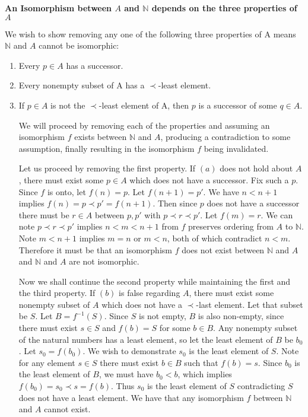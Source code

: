 \documentclass{article}
\begin{document}
\begin{enumerate}
	\medskip
	\textbf{An Isomorphism between $A$ and $\mathbb{N}$ depends on the three properties of $A$}
	\medskip
	
	We wish to show removing any one of the following three properties of A means $\mathbb{N}$ and $A$ cannot be isomorphic:
		\begin{enumerate}
		\item Every $p \in A$ has a successor.
		\item Every nonempty subset of A has a $\prec$-least element.
		\item If $p \in A$ is not the $\prec$-least element of A, then $p$ is a successor of some $q \in A$.
		
		\medskip
		
		We will proceed by removing each of the properties and assuming an isomorphism $f$ exists between $\mathbb{N}$ and $A$, producing a contradiction to some assumption, finally resulting in the isomorphism $f$ being invalidated.
		
		\medskip
		Let us proceed by removing the first property. If $(a)$ does not hold about $A$, there must exist some $p \in A$ which does not have a successor. Fix such a $p$. Since $f$ is onto, let $f(n) = p$. Let $f(n + 1) = p'$. We have $n < n + 1$ implies $f(n) = p \prec p' = f(n + 1)$. Then since $p$ does not have a successor there must be $r \in A$ between $p,p'$ with $p \prec r \prec p'$. Let $f(m) = r$. We can note $p \prec r \prec p'$ implies $n < m < n + 1$ from $f$ preserves ordering from $A$ to $\mathbb{N}$. Note $m < n + 1$ implies $m = n$ or $m < n$, both of which contradict $n < m$. Therefore it must be that an isomorphism $f$ does not exist between $\mathbb{N}$ and $A$ and $\mathbb{N}$ and $A$ are not isomorphic.
		
		\medskip
		Now we shall continue the second property while maintaining the first and the third property. If $(b)$ is false regarding $A$, there must exist some nonempty subset of $A$ which does not have a $\prec$-last element. Let that subset be $S$. Let $B = f^{-1}(S)$. Since $S$ is not empty, $B$ is also non-empty, since there must exist $s \in S$ and $f(b) = S$ for some $b \in B$.	 Any nonempty subset of the natural numbers has a least element, so let the least element of $B$ be $b_0$. Let $s_0 = f(b_0)$. We wish to demonstrate $s_0$ is the least element of $S$. Note for any element $s \in S$ there must exist $b \in B$ such that $f(b) = s$. Since $b_0$ is the least element of $B$, we must have $b_0 < b$, which implies $f(b_0) = s_0 \prec s = f(b)$. Thus $s_0$ is the least element of $S$ contradicting $S$ does not have a least element. We have that any isomorphism $f$ between $\mathbb{N}$ and $A$ cannot exist.
		

\end{enumerate}
\end{enumerate}
\end{document}
